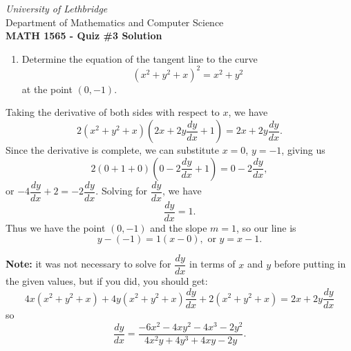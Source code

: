 \documentclass[12pt]{article}
\newcommand{\skipline}{\vspace{12pt}}
\begin{document}
\thispagestyle{empty}
\begin{center}
\emph{University of Lethbridge}\\
Department of Mathematics and Computer Science\\
{\bf MATH 1565 - Quiz \#3 Solution}\\
\end{center}

\thispagestyle{empty}
\begin{enumerate}
 \item Determine the equation of the tangent line to the curve
 \[
 (x^2+y^2+x)^2=x^2+y^2
 \]
 at the point $(0,-1)$.

\end{enumerate}


Taking the derivative of both sides with respect to $x$, we have
\[
2(x^2+y^2+x)\left(2x+2y\frac{dy}{dx}+1\right)=2x+2y\frac{dy}{dx}.
\]
Since the derivative is complete, we can substitute $x=0$, $y=-1$, giving us
\[
2(0+1+0)\left(0-2\frac{dy}{dx}+1\right)=0-2\frac{dy}{dx},
\]
or $-4\dfrac{dy}{dx}+2=-2\dfrac{dy}{dx}$. Solving for $\dfrac{dy}{dx}$, we have
\[
\dfrac{dy}{dx} = 1.
\]
Thus we have the point $(0,-1)$ and the slope $m=1$, so our line is
\[
y-(-1)=1(x-0), \text{ or } y=x-1.
\]

\textbf{Note:} it was not necessary to solve for $\dfrac{dy}{dx}$ in terms of $x$ and $y$ before putting in the given values, but if you did, you should get:
\[
4x(x^2+y^2+x)+4y(x^2+y^2+x)\frac{dy}{dx}+2(x^2+y^2+x) = 2x+2y\frac{dy}{dx}
\]
so
\[
\frac{dy}{dx} = \frac{-6x^2-4xy^2-4x^3-2y^2}{4x^2y+4y^3+4xy-2y}.
\]
\end{document}
